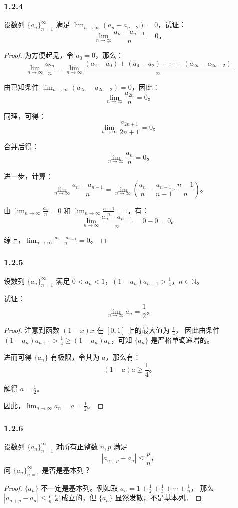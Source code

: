 \documentclass[12pt]{ctexart}
\begin{document}
\subsubsection*{1.2.4} 
设数列 $\{a_n\}_{n=1}^\infty$ 满足 $\lim_{n \to \infty} (a_n - a_{n-2}) = 0$，试证：
\[
\lim_{n \to \infty} \frac{a_n - a_{n-1}}{n} = 0。
\]
\begin{proof}
为方便起见，令 $a_0 = 0$，那么：
\[
\lim_{n \to \infty} \frac{a_{2n}}{n} = \lim_{n \to \infty} \frac{(a_2 - a_0) + (a_4 - a_2) + \cdots + (a_{2n} - a_{2n-2})}{n}.
\]

由已知条件 $\lim_{n \to \infty} (a_{2n} - a_{2n-2}) = 0$，因此：
\[
\lim_{n \to \infty} \frac{a_{2n}}{n} = 0。
\]

同理，可得：
\[
\lim_{n \to \infty} \frac{a_{2n+1}}{2n+1} = 0。
\]

合并后得：
\[
\lim_{n \to \infty} \frac{a_n}{n} = 0。
\]

进一步，计算：
\[
\lim_{n \to \infty} \frac{a_n - a_{n-1}}{n} = \lim_{n \to \infty} \left( \frac{a_n}{n} - \frac{a_{n-1}}{n-1} \cdot \frac{n-1}{n} \right)。
\]

由 $\lim_{n \to \infty} \frac{a_n}{n} = 0$ 和 $\lim_{n \to \infty} \frac{n-1}{n} = 1$，有：
\[
\lim_{n \to \infty} \frac{a_n - a_{n-1}}{n} = 0 - 0 = 0。
\]

综上，$\lim_{n \to \infty} \frac{a_n - a_{n-1}}{n} = 0$。
\end{proof}

\subsubsection*{1.2.5} 
设数列 $\{a_n\}_{n=1}^\infty$ 满足 $0 < a_n < 1$，$(1 - a_n)a_{n+1} > \frac{1}{4}$，$n \in \mathbb{N}$。

试证：
\[
\lim_{n \to \infty} a_n = \frac{1}{2}。
\]

\begin{proof}
注意到函数 $(1 - x)x$ 在 $[0, 1]$ 上的最大值为 $\frac{1}{4}$，  
因此由条件 $(1 - a_n)a_{n+1} > \frac{1}{4} \geq (1 - a_n)a_n$，可知 $\{a_n\}$ 是严格单调递增的。

进而可得 $\{a_n\}$ 有极限，令其为 $a$，那么有：
\[
(1 - a)a \geq \frac{1}{4}。
\]

解得 $a = \frac{1}{2}$。

因此，$\lim_{n \to \infty} a_n = a = \frac{1}{2}$。
\end{proof}

\subsubsection*{1.2.6} 
设数列 $\{a_n\}_{n=1}^\infty$ 对所有正整数 $n, p$ 满足
\[
|a_{n+p} - a_n| \leq \frac{p}{n}，
\]
问 $\{a_n\}_{n=1}^\infty$ 是否是基本列？
\begin{proof}
$\{a_n\}$ 不一定是基本列。例如取 $a_n = 1 + \frac{1}{2} + \frac{1}{3} + \cdots + \frac{1}{n}$，  
那么 $|a_{n+p} - a_n| \leq \frac{p}{n}$ 是成立的，但 $\{a_n\}$ 显然发散，不是基本列。
\end{proof}
\end{document}
